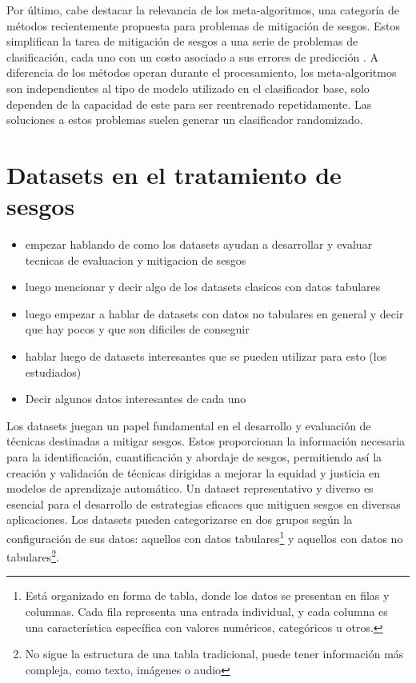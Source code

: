 Por \'ultimo, cabe destacar la relevancia de los meta-algoritmos, una categor\'ia de m\'etodos recientemente propuesta para problemas de 
mitigaci\'on de sesgos. Estos simplifican la tarea de mitigaci\'on de sesgos a una serie de problemas de clasificaci\'on, cada uno con 
un costo asociado a sus errores de predicci\'on \parencite{agarwal2018reductions, agarwal2019fair}.
A diferencia de los m\'etodos operan durante el procesamiento, los meta-algoritmos son independientes al tipo de modelo utilizado en el 
clasificador base, solo dependen de la capacidad de este para ser reentrenado repetidamente. Las soluciones a estos problemas suelen generar
un clasificador randomizado.

\section{Datasets en el tratamiento de sesgos}
    \begin{itemize}
        \item empezar hablando de como los datasets ayudan a desarrollar y evaluar tecnicas de evaluacion y mitigacion de sesgos
        \item luego mencionar y decir algo de los datasets clasicos con datos tabulares
        \item luego empezar a hablar de datasets con datos no tabulares en general y decir que hay pocos y que son dificiles de conseguir 
        \item hablar luego de datasets interesantes que se pueden utilizar para esto (los estudiados)
        \item Decir algunos datos interesantes de cada uno
    \end{itemize}

    Los datasets juegan un papel fundamental en el desarrollo y evaluaci\'on de t\'ecnicas destinadas a mitigar sesgos. Estos proporcionan la 
    informaci\'on necesaria para la identificaci\'on, cuantificaci\'on y abordaje de sesgos, permitiendo as\'i 
    la creaci\'on y validaci\'on de t\'ecnicas dirigidas a mejorar la equidad y justicia en modelos de aprendizaje autom\'atico. 
    Un dataset representativo y diverso es esencial para el desarrollo de estrategias eficaces que mitiguen sesgos en diversas aplicaciones. 
    Los datasets pueden categorizarse en dos grupos seg\'un la configuraci\'on de sus datos: 
    aquellos con datos tabulares\footnote{Est\'a organizado en forma de tabla, donde los datos se presentan en filas y columnas. Cada fila representa
    una entrada individual, y cada columna es una caracter\'istica espec\'ifica con valores num\'ericos, categ\'oricos u otros.} 
    y aquellos con datos no tabulares\footnote{No sigue la estructura de una tabla tradicional, puede tener informaci\'on m\'as compleja, como 
    texto, im\'agenes o audio}.
    
